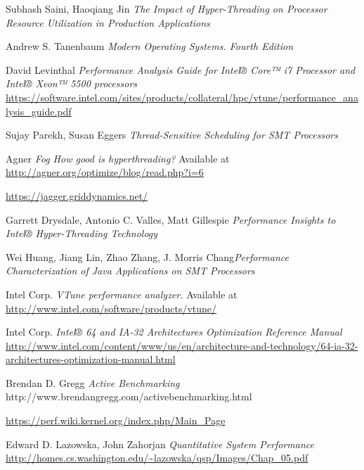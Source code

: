 \documentclass[12pt]{article}
\begin{document}
\begin{thebibliography}{1}

   Subhash Saini, Haoqiang Jin {\em The Impact of Hyper-Threading on Processor Resource Utilization in Production Applications}

   Andrew S. Tanenbaum {\em Modern Operating Systems. Fourth Edition}

   David Levinthal {\em Performance Analysis Guide for Intel® Core™ i7 Processor and Intel® Xeon™ 5500 processors} \url{https://software.intel.com/sites/products/collateral/hpc/vtune/performance_analysis_guide.pdf}
  
   Sujay Parekh, Susan Eggers {\em Thread-Sensitive Scheduling for SMT Processors}
  
   Agner {\em Fog How good is hyperthreading?} Available at \url{http://agner.org/optimize/blog/read.php?i=6}

   \url{https://jagger.griddynamics.net/}
  
   Garrett Drysdale, Antonio C. Valles, Matt Gillespie {\em Performance Insights to Intel® Hyper-Threading Technology}
  
  \bibitem{} Wei Huang, Jiang Lin, Zhao Zhang, J. Morris Chang{\em Performance Characterization of Java Applications on SMT Processors}
  
   Intel Corp. {\em VTune performance analyzer.} Available at \url{http://www.intel.com/software/products/vtune/}
  
   Intel Corp. {\em Intel® 64 and IA-32 Architectures Optimization Reference Manual} \url{http://www.intel.com/content/www/us/en/architecture-and-technology/64-ia-32-architectures-optimization-manual.html}

   Brendan D. Gregg {\em Active Benchmarking} http://www.brendangregg.com/activebenchmarking.html
  
   \url{https://perf.wiki.kernel.org/index.php/Main_Page}
  
   Edward D. Lazowska, John Zahorjan {\em Quantitative System Performance} \url{http://homes.cs.washington.edu/~lazowska/qsp/Images/Chap_05.pdf}
    
\end{thebibliography}
\end{document}
